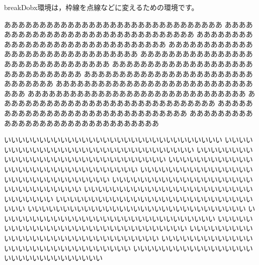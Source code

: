 \begin{breakDbox}
%
\textsf{breakDobx}環境は，枠線を点線などに変えるための環境です。

あああああああああああああああああああああああああああああああ
あああああああああああああああああああああああああああああああ
あああああああああああああああああああああああああああああああ
あああああああああああああああああああああああああああああああ
あああああああああああああああああああああああああああああああ
あああああああああああああああああああああああああああああああ
あああああああああああああああああああああああああああああああ
あああああああああああああああああああああああああああああああ
あああああああああああああああああああああああああああああああ
あああああああああああああああああああああああああああああああ
あああああああああああああああああああああああああああああああ
あああああああああああああああああああああああああああああああ

いいいいいいいいいいいいいいいいいいいいいいいいいいいいいいい
いいいいいいいいいいいいいいいいいいいいいいいいいいいいいいい
いいいいいいいいいいいいいいいいいいいいいいいいいいいいいいい
いいいいいいいいいいいいいいいいいいいいいいいいいいいいいいい
いいいいいいいいいいいいいいいいいいいいいいいいいいいいいいい
いいいいいいいいいいいいいいいいいいいいいいいいいいいいいいい
いいいいいいいいいいいいいいいいいいいいいいいいいいいいいいい
いいいいいいいいいいいいいいいいいいいいいいいいいいいいいいい
いいいいいいいいいいいいいいいいいいいいいいいいいいいいいいい
いいいいいいいいいいいいいいいいいいいいいいいいいいいいいいい
いいいいいいいいいいいいいいいいいいいいいいいいいいいいいいい
いいいいいいいいいいいいいいいいいいいいいいいいいいいいいいい
いいいいいいいいいいいいいいいいいいいいいいいいいいいいいいい
いいいいいいいいいいいいいいいいいいいいいいいいいいいいいいい


\end{breakDbox}
